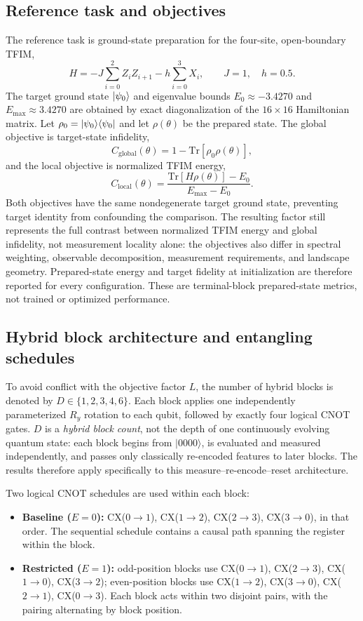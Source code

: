 \documentclass[pdflatex,sn-basic,Numbered]{sn-jnl}
\newcommand{\cx}[2]{CX($#1\!\to\!#2$)}
\begin{document}
\subsection{Reference task and objectives}

The reference task is ground-state preparation for the four-site, open-boundary TFIM,
\[
H=-J\sum_{i=0}^{2}Z_i Z_{i+1}-h\sum_{i=0}^{3}X_i,
\qquad J=1,\quad h=0.5.
\]
The target ground state $\ket{\psi_0}$ and eigenvalue bounds $E_0\approx-3.4270$ and $E_{\max}\approx3.4270$ are obtained by exact diagonalization of the $16\times16$ Hamiltonian matrix. Let $\rho_0=\ket{\psi_0}\!\bra{\psi_0}$ and let $\rho(\theta)$ be the prepared state. The global objective is target-state infidelity,
\[
C_{\mathrm{global}}(\theta)
=1-\mathrm{Tr}[\rho_0\rho(\theta)],
\]
and the local objective is normalized TFIM energy,
\[
C_{\mathrm{local}}(\theta)
=\frac{\mathrm{Tr}[H\rho(\theta)]-E_0}{E_{\max}-E_0}.
\]
Both objectives have the same nondegenerate target ground state, preventing target identity from confounding the comparison. The resulting factor still represents the full contrast between normalized TFIM energy and global infidelity, not measurement locality alone: the objectives also differ in spectral weighting, observable decomposition, measurement requirements, and landscape geometry. Prepared-state energy and target fidelity at initialization are therefore reported for every configuration. These are terminal-block prepared-state metrics, not trained or optimized performance.

\subsection{Hybrid block architecture and entangling schedules}
\label{sec:ansatz}

To avoid conflict with the objective factor $L$, the number of hybrid blocks is denoted by $D\in\{1,2,3,4,6\}$. Each block applies one independently parameterized $R_y$ rotation to each qubit, followed by exactly four logical CNOT gates. $D$ is a \emph{hybrid block count}, not the depth of one continuously evolving quantum state: each block begins from $\lvert0000\rangle$, is evaluated and measured independently, and passes only classically re-encoded features to later blocks. The results therefore apply specifically to this measure--re-encode--reset architecture.

Two logical CNOT schedules are used within each block:

\begin{itemize}
\item \textbf{Baseline ($E=0$):} \cx{0}{1}, \cx{1}{2}, \cx{2}{3}, \cx{3}{0}, in that order. The sequential schedule contains a causal path spanning the register within the block.
\item \textbf{Restricted ($E=1$):} odd-position blocks use \cx{0}{1}, \cx{2}{3}, \cx{1}{0}, \cx{3}{2}; even-position blocks use \cx{1}{2}, \cx{3}{0}, \cx{2}{1}, \cx{0}{3}. Each block acts within two disjoint pairs, with the pairing alternating by block position.
\end{itemize}
\end{document}
